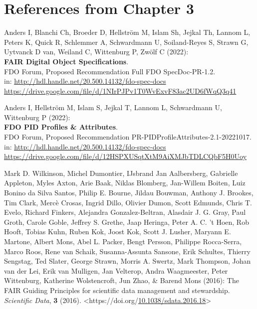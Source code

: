 
\section{References from Chapter 3}

\begin{thebibliography}{9}
   
Anders I, Blanchi Ch, Broeder D, Hellström M, Islam Sh, Jejkal Th, Lannom L, Peters K, Quick R, Schlemmer A, Schwardmann U, Soiland-Reyes S, Strawn G, Uytvanck D van, Weiland C, Wittenburg P, Zwölf C (2022):\\
\textbf{FAIR Digital Object Specifications}.\\
FDO Forum, Proposed Recommendation Full FDO SpecDoc-PR-1.2. \\
in: \url{http://hdl.handle.net/20.500.14132/fdo-spec-docs}\\
\url{https://drive.google.com/file/d/1NIrPJPv1T0WvExvF83ac2UD6fWqQ3q41}

Anders I, Hellström M, Islam S, Jejkal T, Lannom L, Schwardmann U, Wittenburg P (2022):\\
\textbf{FDO PID Profiles \& Attributes}.\\
FDO Forum,  Proposed Recommendation PR-PIDProfileAttributes-2.1-20221017.
in: \url{http://hdl.handle.net/20.500.14132/fdo-spec-docs}\\
\url{https://drive.google.com/file/d/12HSPXUSqtXtM9AiXMJbTDLCQbF5H0Uoy}



Mark D. Wilkinson, Michel Dumontier, IJsbrand Jan Aalbersberg, Gabrielle
Appleton, Myles Axton, Arie Baak, Niklas Blomberg, Jan-Willem Boiten,
Luiz Bonino da Silva Santos, Philip E. Bourne, Jildau Bouwman, Anthony
J. Brookes, Tim Clark, Mercè Crosas, Ingrid Dillo, Olivier Dumon, Scott
Edmunds, Chris T. Evelo, Richard Finkers, Alejandra Gonzalez-Beltran,
Alasdair J. G. Gray, Paul Groth, Carole Goble, Jeffrey S. Grethe, Jaap
Heringa, Peter A. C. 't Hoen, Rob Hooft, Tobias Kuhn, Ruben Kok, Joost
Kok, Scott J. Lusher, Maryann E. Martone, Albert Mons, Abel L. Packer,
Bengt Persson, Philippe Rocca-Serra, Marco Roos, Rene van Schaik,
Susanna-Assunta Sansone, Erik Schultes, Thierry Sengstag, Ted Slater,
George Strawn, Morris A. Swertz, Mark Thompson, Johan van der Lei, Erik
van Mulligen, Jan Velterop, Andra Waagmeester, Peter Wittenburg,
Katherine Wolstencroft, Jun Zhao, \& Barend Mons (2016): The {FAIR
Guiding Principles} for scientific data management and stewardship.
\emph{Scientific Data}, \textbf{3} (2016).
\textless https://doi.org/\href{https://doi.org/10.1038/sdata.2016.18}{10.1038/sdata.2016.18}\textgreater{}


\end{thebibliography}
